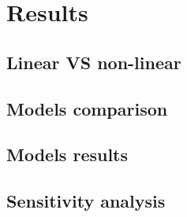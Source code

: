 \section{Results}

\subsection{Linear VS non-linear}
\begin{frame}
\end{frame}

\subsection{Models comparison}
\begin{frame}
\end{frame}

\subsection{Models results}
\begin{frame}
\end{frame}

\subsection{Sensitivity analysis}
\begin{frame}
\end{frame}


